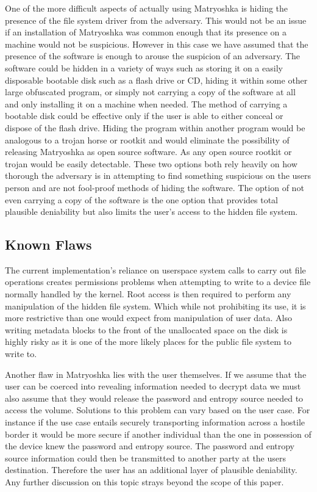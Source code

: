 \documentclass{article}
\begin{document}
\begin{multicols}{2}
One of the more difficult aspects of actually using Matryoshka is hiding the presence of the file system driver from the adversary. This would not be an issue if an installation of Matryoshka was common enough that its presence on a machine would not be suspicious. However in this case we have assumed that the presence of the software is enough to arouse the suspicion of an adversary. The software could be hidden in a variety of ways such as storing it on a easily disposable bootable disk such as a flash drive or CD, hiding it within some other large obfuscated program, or simply not carrying a copy of the software at all and only installing it on a machine when needed. The method of carrying a bootable disk could be effective only if the user is able to either conceal or dispose of the flash drive. Hiding the program within another program would be analogous to a trojan horse or rootkit and would eliminate the possibility of releasing Matryoshka as open source software. As any open source rootkit or trojan would be easily detectable. These two options both rely heavily on how thorough the adversary is in attempting to find something suspicious on the users person and are not fool-proof methods of hiding the software. The option of not even carrying a copy of the software is the one option that provides total plausible deniability but also limits the user's access to the hidden file system. 

\subsection{Known Flaws} 
The current implementation's reliance on userspace system calls to carry out file operations creates permissions problems when attempting to write to a device file normally handled by the kernel. Root access is then required to perform any manipulation of the hidden file system. Which while not prohibiting its use, it is more restrictive than one would expect from manipulation of user data. Also writing metadata blocks to the front of the unallocated space on the disk is highly risky as it is one of the more likely places for the public file system to write to.

Another flaw in Matryoshka lies with the user themselves. If we assume that the user can be coerced into revealing information needed to decrypt data we must also assume that they would release the password and entropy source needed to access the volume. Solutions to this problem can vary based on the user case. For instance if the use case entails securely transporting information across a hostile border it would be more secure if another individual than the one in possession of the device knew the password and entropy source. The password and entropy source information could then be transmitted to another party at the users destination. Therefore the user has an additional layer of plausible deniability. Any further discussion on this topic strays beyond the scope of this paper.


\end{multicols}
\end{document}

